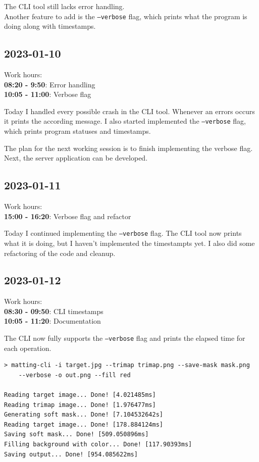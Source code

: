 \documentclass{article}
\begin{document}
The CLI tool still lacks error handling. \\
Another feature to add is the \texttt{--verbose} flag,
which prints what the program is doing along with timestamps.

\subsection{2023-01-10}

Work hours:\\
\textbf{08:20 - 9:50}: Error handling \\
\textbf{10:05 - 11:00}: Verbose flag

Today I handled every possible crash in the CLI tool.
Whenever an errors occurs it prints the according message.
I also started implemented the \texttt{--verbose} flag,
which prints program statuses and timestamps.

The plan for the next working session is to finish implementing the verbose flag.
Next, the server application can be developed.

\subsection{2023-01-11}

Work hours:\\
\textbf{15:00 - 16:20}: Verbose flag and refactor

Today I continued implementing the \texttt{--verbose} flag.
The CLI tool now prints what it is doing, but I haven't implemented the timestampts yet.
I also did some refactoring of the code and cleanup.

\subsection{2023-01-12}

Work hours:\\
\textbf{08:30 - 09:50}: CLI timestamps \\
\textbf{10:05 - 11:20}: Documentation

The CLI now fully supports the \texttt{--verbose} flag
and prints the elapsed time for each operation.

\begin{lstlisting}[style=boxed]
> matting-cli -i target.jpg --trimap trimap.png --save-mask mask.png
    --verbose -o out.png --fill red

Reading target image... Done! [4.021485ms]
Reading trimap image... Done! [1.976477ms]
Generating soft mask... Done! [7.104532642s]
Reading target image... Done! [178.884124ms]
Saving soft mask... Done! [509.050896ms]
Filling background with color... Done! [117.90393ms]
Saving output... Done! [954.085622ms]
\end{lstlisting}
\end{document}
